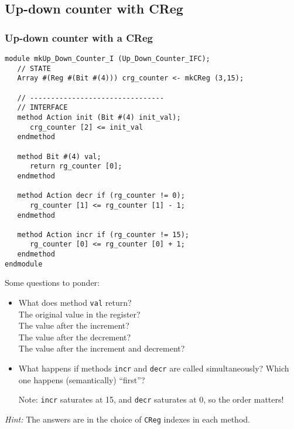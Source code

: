 
\subsection{Up-down counter with CReg}

\begin{frame}[fragile]
\frametitle{Up-down counter with a CReg}

\footnotesize

\begin{minipage}{0.5\textwidth}\scriptsize
\begin{Verbatim}[frame=single]
module mkUp_Down_Counter_I (Up_Down_Counter_IFC);
   // STATE
   Array #(Reg #(Bit #(4))) crg_counter <- mkCReg (3,15);

   // --------------------------------
   // INTERFACE
   method Action init (Bit #(4) init_val);
      crg_counter [2] <= init_val
   endmethod

   method Bit #(4) val;
      return rg_counter [0];
   endmethod

   method Action decr if (rg_counter != 0);
      rg_counter [1] <= rg_counter [1] - 1;
   endmethod

   method Action incr if (rg_counter != 15);
      rg_counter [0] <= rg_counter [0] + 1;
   endmethod
endmodule
\end{Verbatim}
\end{minipage}
\hm
\begin{minipage}{0.45\textwidth}
 Some questions to ponder:

 \begin{itemize}

  \item What does method {\tt val} return? \\
        \hm The original value in the register? \\
        \hm The value after the increment? \\
        \hm The value after the decrement? \\
        \hm The value after the increment and decrement?

  \item What happens if methods {\tt incr} and {\tt decr} are called
        simultaneously?  Which one happens (semantically) ``first''?

        Note: {\tt incr} saturates at 15, and {\tt decr} saturates at
        0, so the order matters!

 \end{itemize}

 \vspace{2ex}

 \emph{Hint:} The answers are in the choice of {\tt CReg} indexes in each method.
\end{minipage}

\end{frame}


